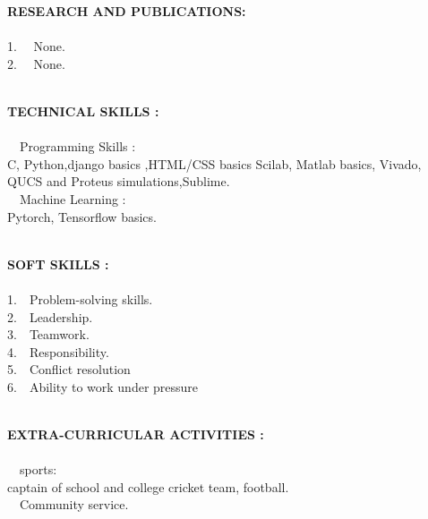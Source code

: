 \documentclass[1pt]{article}
\begin{document}
\begin{flushleft}
\begin{flushleft}
			{\small \textbf{RESEARCH AND PUBLICATIONS:}}\\ \ \\
			1. \ \ None.\\
			2. \ \ None.\\
			
			\hspace{1cm}\\ \hspace{1cm}
			
			{\small \textbf{TECHNICAL SKILLS :}}\\ \ \\
			\textbullet \ \  Programming Skills :  \\ \hspace{1.4cm}C, Python,django basics ,HTML/CSS basics Scilab, Matlab basics, Vivado, QUCS and Proteus simulations,Sublime.\\
			
			\textbullet \ \ Machine Learning :  \\ \hspace{1.4cm}Pytorch, Tensorflow basics.\\
			
			
			\hspace{1cm}\\ \hspace{1cm}
			
			
			{\small \textbf{SOFT SKILLS :}}\\ \ \\
			1.\ \ Problem-solving skills.\\
			2.\ \  Leadership.\\	
			3.\ \ Teamwork.\\
			4.\ \ Responsibility.\\
			5.\ \ Conflict resolution\\
			6.\ \ Ability to work under pressure\\
			
			\hspace{1cm}\\ \hspace{1cm}
			
			
			{\small \textbf{EXTRA-CURRICULAR ACTIVITIES :}}\\ \ \\
			\textbullet \ \ sports:\\ \hspace{1cm}captain of school and college cricket team, football.\\
			\textbullet \ \ Community service.\\
			

\end{flushleft}
\end{flushleft}
\end{document}
